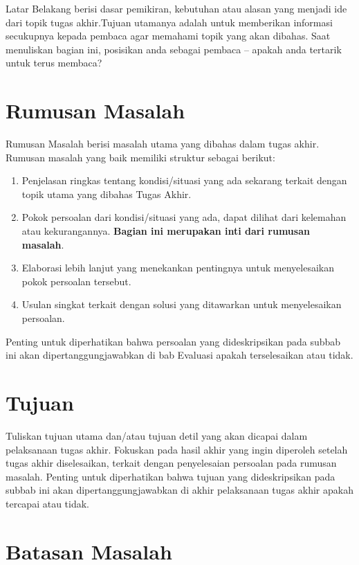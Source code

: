 Latar Belakang berisi dasar pemikiran, kebutuhan atau alasan yang menjadi ide dari topik tugas akhir.Tujuan utamanya adalah untuk memberikan informasi secukupnya kepada pembaca agar memahami topik yang akan dibahas.  Saat menuliskan bagian ini, posisikan anda sebagai pembaca – apakah anda tertarik untuk terus membaca?

\section{Rumusan Masalah}

Rumusan Masalah berisi masalah utama yang dibahas dalam tugas akhir. Rumusan masalah yang baik memiliki struktur sebagai berikut:

\begin{enumerate}
    \item Penjelasan ringkas tentang kondisi/situasi yang ada sekarang terkait dengan topik utama yang dibahas Tugas Akhir.
    \item Pokok persoalan dari kondisi/situasi yang ada, dapat dilihat dari kelemahan atau kekurangannya. \textbf{Bagian ini merupakan inti dari rumusan masalah}.
    \item Elaborasi lebih lanjut yang menekankan pentingnya untuk menyelesaikan pokok persoalan tersebut.
    \item Usulan singkat terkait dengan solusi yang ditawarkan untuk menyelesaikan persoalan.
\end{enumerate}

Penting untuk diperhatikan bahwa persoalan yang dideskripsikan pada subbab ini akan dipertanggungjawabkan di bab Evaluasi apakah terselesaikan atau tidak.

\section{Tujuan}

Tuliskan tujuan utama dan/atau tujuan detil yang akan dicapai dalam pelaksanaan tugas akhir. Fokuskan pada hasil akhir yang ingin diperoleh setelah tugas akhir diselesaikan, terkait dengan penyelesaian persoalan pada rumusan masalah. Penting untuk diperhatikan bahwa tujuan yang dideskripsikan pada subbab ini akan dipertanggungjawabkan di akhir pelaksanaan tugas akhir apakah tercapai atau tidak.

\section{Batasan Masalah}


